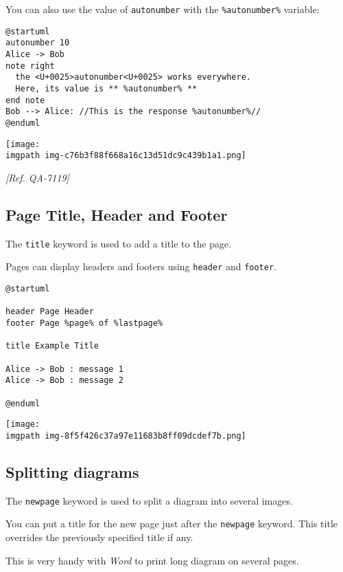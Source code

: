 You can also use the value of \texttt{autonumber} with the \texttt{\%autonumber\%} variable:
\begin{verbatim}
@startuml
autonumber 10
Alice -> Bob
note right
  the <U+0025>autonumber<U+0025> works everywhere.
  Here, its value is ** %autonumber% **
end note
Bob --> Alice: //This is the response %autonumber%//
@enduml
\end{verbatim}
\begin{center}
\texttt{[image: \\imgpath img-c76b3f88f668a16c13d51dc9c439b1a1.png]}
\end{center}
\textit{[Ref. QA-7119]}
%
%
\subsection{Page Title, Header and Footer}


The \texttt{title} keyword is used to add a title to the page.


Pages can display headers and footers using \texttt{header} and \texttt{footer}.


\begin{verbatim}
@startuml

header Page Header
footer Page %page% of %lastpage%

title Example Title

Alice -> Bob : message 1
Alice -> Bob : message 2

@enduml
\end{verbatim}
\begin{center}
\texttt{[image: \\imgpath img-8f5f426c37a97e11683b8ff09dcdef7b.png]}
\end{center}




%
%
\subsection{Splitting diagrams}




The \texttt{newpage} keyword is used to split a diagram into several images.


You can put a title for the new page just after the \texttt{newpage}
keyword.  This title overrides the previously specified title if any.


This is very handy with \textit{Word} to print long diagram on
several pages.


